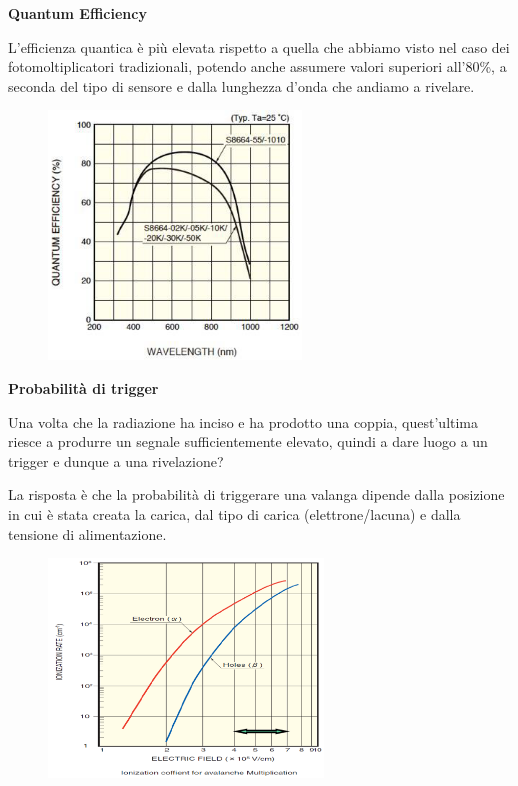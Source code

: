 \vspace{0.2cm}\textbf{Quantum Efficiency}

L'efficienza quantica è più elevata rispetto a quella che abbiamo visto nel caso dei fotomoltiplicatori tradizionali, potendo anche assumere valori superiori all'80\%, a seconda del tipo di sensore e dalla lunghezza d'onda che andiamo a rivelare.

\begin{figure}[H]
   \centering
   \includegraphics[width=0.6\textwidth]{immagini/Efficienza_quantica_SiPM.png}
\end{figure}

\textbf{Probabilità di trigger}

Una volta che la radiazione ha inciso e ha prodotto una coppia, quest'ultima riesce a produrre un segnale sufficientemente elevato, quindi a dare luogo a un trigger e dunque a una rivelazione?

La risposta è che la  probabilità di triggerare una valanga dipende dalla posizione in cui è stata creata la carica, dal tipo di carica (elettrone/lacuna) e dalla tensione di alimentazione.

\begin{figure}[H]
   \centering
   \includegraphics[width=0.65\textwidth]{immagini/probabilita_trigger_SiPM.png}
\end{figure}

